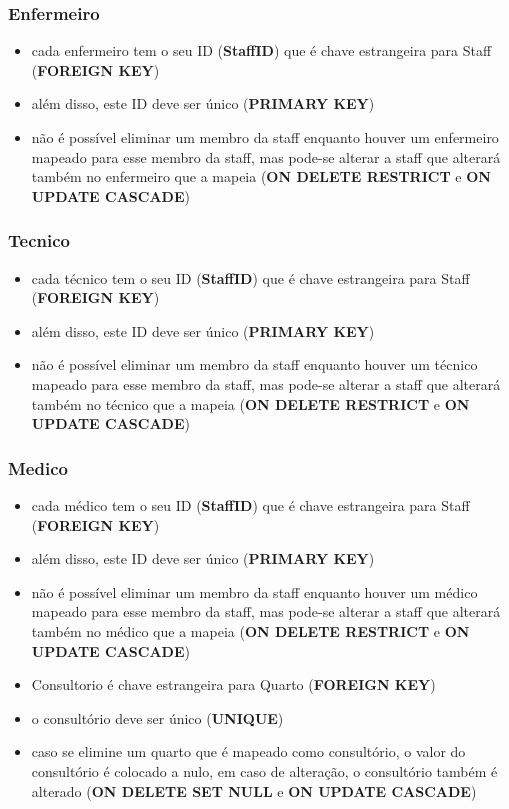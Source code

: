 \documentclass[article, a4paper, 12pt, oneside]{memoir}
\begin{document}
\subsubsection*{Enfermeiro}
\begin{itemize}
	\item cada enfermeiro tem o seu ID (\textbf{StaffID}) que é chave estrangeira para Staff (\textbf{FOREIGN KEY})
	\item além disso, este ID deve ser único (\textbf{PRIMARY KEY})
	\item não é possível eliminar um membro da staff enquanto houver um enfermeiro mapeado para esse membro da staff, mas pode-se alterar a staff que alterará também no enfermeiro que a mapeia (\textbf{ON DELETE RESTRICT} e \textbf{ON UPDATE CASCADE})
\end{itemize}

\newpage

\subsubsection*{Tecnico}
\begin{itemize}
	\item cada técnico tem o seu ID (\textbf{StaffID}) que é chave estrangeira para Staff (\textbf{FOREIGN KEY})
	\item além disso, este ID deve ser único (\textbf{PRIMARY KEY})
	\item não é possível eliminar um membro da staff enquanto houver um técnico mapeado para esse membro da staff, mas pode-se alterar a staff que alterará também no técnico que a mapeia (\textbf{ON DELETE RESTRICT} e \textbf{ON UPDATE CASCADE})
\end{itemize}

\subsubsection*{Medico}
\begin{itemize}
	\item cada médico tem o seu ID (\textbf{StaffID}) que é chave estrangeira para Staff (\textbf{FOREIGN KEY})
	\item além disso, este ID deve ser único (\textbf{PRIMARY KEY})
	\item não é possível eliminar um membro da staff enquanto houver um médico mapeado para esse membro da staff, mas pode-se alterar a staff que alterará também no médico que a mapeia (\textbf{ON DELETE RESTRICT} e \textbf{ON UPDATE CASCADE})
	\item Consultorio é chave estrangeira para Quarto (\textbf{FOREIGN KEY})
	\item o consultório deve ser único (\textbf{UNIQUE})
	\item caso se elimine um quarto que é mapeado como consultório, o valor do consultório é colocado a nulo, em caso de alteração, o consultório também é alterado (\textbf{ON DELETE SET NULL} e \textbf{ON UPDATE CASCADE})
\end{itemize}
\end{document}

